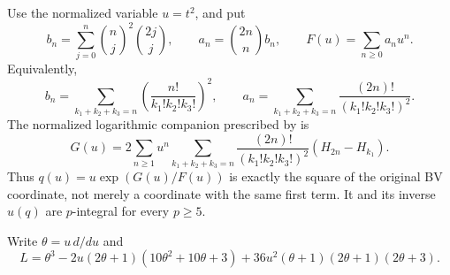 \documentclass[11pt,a4paper]{article}
\theoremstyle{definition}\newtheorem{definition}[theorem]{Definition}
\theoremstyle{remark}\newtheorem{remark}[theorem]{Remark}
\numberwithin{equation}{section}
\begin{document}
Use the normalized variable $u=t^2$, and put
\[
 b_n=\sum_{j=0}^n\binom nj^2\binom{2j}{j},\qquad
 a_n=\binom{2n}{n}b_n,\qquad F(u)=\sum_{n\geq0}a_nu^n.
\]
Equivalently,
\[
 b_n=\sum_{k_1+k_2+k_3=n}
       \left(\frac{n!}{k_1!k_2!k_3!}\right)^2,
 \qquad
 a_n=\sum_{k_1+k_2+k_3=n}
       \frac{(2n)!}{(k_1!k_2!k_3!)^2}.
\]
The normalized logarithmic companion prescribed by
\cite[\S7 and Proposition 9.1]{BV3} is
\begin{equation}\label{T:eq:octa-BV-G}
 G(u)=2\sum_{n\geq1}u^n
 \sum_{k_1+k_2+k_3=n}
 \frac{(2n)!}{(k_1!k_2!k_3!)^2}(H_{2n}-H_{k_1}).
\end{equation}
Thus $q(u)=u\exp(G(u)/F(u))$ is exactly the square of the
original BV coordinate, not merely a coordinate with the same first term.
It and its inverse $u(q)$ are $p$-integral for every $p\geq5$.

Write $\theta=u\,d/du$ and
\begin{equation}\label{T:eq:octa-L}
 L=\theta^3-2u(2\theta+1)(10\theta^2+10\theta+3)
       +36u^2(\theta+1)(2\theta+1)(2\theta+3).
\end{equation}
\end{document}
